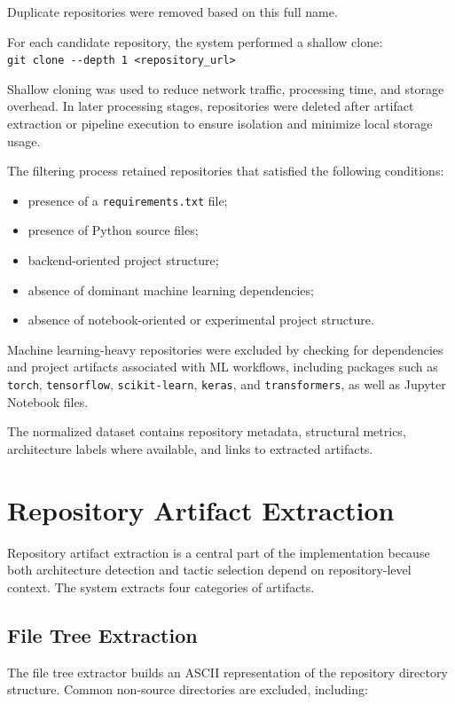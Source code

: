 Duplicate repositories were removed based on this full name.

For each candidate repository, the system performed a shallow clone: \\
\verb|git clone --depth 1 <repository_url>|

Shallow cloning was used to reduce network traffic, processing time, and storage overhead. In later processing stages, repositories were deleted after artifact extraction or pipeline execution to ensure isolation and minimize local storage usage.

The filtering process retained repositories that satisfied the following conditions:

\begin{itemize}
    \item presence of a \texttt{requirements.txt} file;
    \item presence of Python source files;
    \item backend-oriented project structure;
    \item absence of dominant machine learning dependencies;
    \item absence of notebook-oriented or experimental project structure.
\end{itemize}

Machine learning-heavy repositories were excluded by checking for dependencies and project artifacts associated with ML workflows, including packages such as \texttt{torch}, \texttt{tensorflow}, \texttt{scikit-learn}, \texttt{keras}, and \texttt{transformers}, as well as Jupyter Notebook files.

The normalized dataset contains repository metadata, structural metrics, architecture labels where available, and links to extracted artifacts.

\section{Repository Artifact Extraction}

Repository artifact extraction is a central part of the implementation because both architecture detection and tactic selection depend on repository-level context. The system extracts four categories of artifacts.

\subsection{File Tree Extraction}

The file tree extractor builds an ASCII representation of the repository directory structure. Common non-source directories are excluded, including:

